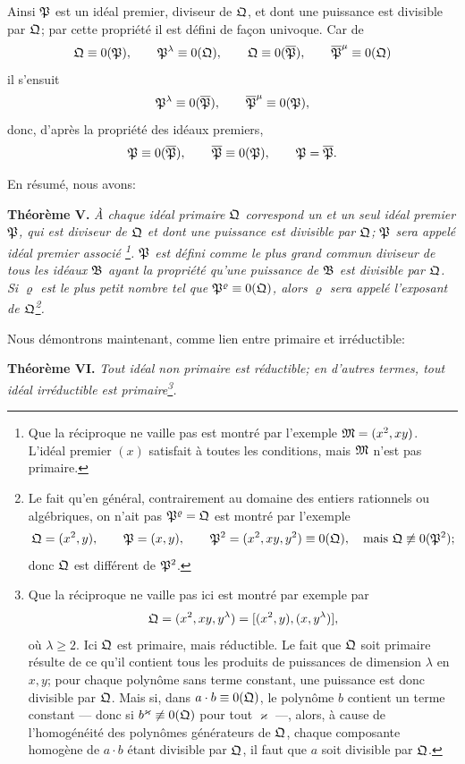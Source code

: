 Ainsi $\mathfrak{P}$ est un idéal premier, diviseur de $\mathfrak{Q}$, et dont une puissance est divisible par $\mathfrak{Q}$; par cette propriété il est défini de façon univoque. Car de
\[
 \mathfrak{Q}\equiv0(\mathfrak{P}),\qquad \mathfrak{P}^\lambda\equiv0(\mathfrak{Q}),\qquad
 \mathfrak{Q}\equiv0(\overline{\mathfrak{P}}),\qquad \overline{\mathfrak{P}}^{\mu}\equiv0(\mathfrak{Q})
\]
il s'ensuit
\[
 \mathfrak{P}^\lambda\equiv0(\overline{\mathfrak{P}}),\qquad
 \overline{\mathfrak{P}}^{\mu}\equiv0(\mathfrak{P}),
\]
donc, d'après la propriété des idéaux premiers,
\[
 \mathfrak{P}\equiv0(\overline{\mathfrak{P}}),\qquad
 \overline{\mathfrak{P}}\equiv0(\mathfrak{P}),\qquad
 \mathfrak{P}=\overline{\mathfrak{P}}.
\]

En résumé, nous avons:

\textbf{Théorème V.} \emph{À chaque idéal primaire $\mathfrak{Q}$ correspond un et un seul idéal premier $\mathfrak{P}$, qui est diviseur de $\mathfrak{Q}$ et dont une puissance est divisible par $\mathfrak{Q}$; $\mathfrak{P}$ sera appelé \og{} idéal premier associé \fg{}\footnote{Que la réciproque ne vaille pas est montré par l'exemple $\mathfrak{M}=(x^2,xy)$. L'idéal premier $(x)$ satisfait à toutes les conditions, mais $\mathfrak{M}$ n'est pas primaire.}. $\mathfrak{P}$ est défini comme le plus grand commun diviseur de tous les idéaux $\mathfrak{B}$ ayant la propriété qu'une puissance de $\mathfrak{B}$ est divisible par $\mathfrak{Q}$. Si $\varrho$ est le plus petit nombre tel que $\mathfrak{P}^\varrho\equiv0(\mathfrak{Q})$, alors $\varrho$ sera appelé l'exposant de $\mathfrak{Q}$\footnote{Le fait qu'en général, contrairement au domaine des entiers rationnels ou algébriques, on n'ait pas $\mathfrak{P}^\varrho=\mathfrak{Q}$ est montré par l'exemple
\[
 \mathfrak{Q}=(x^2,y),\qquad \mathfrak{P}=(x,y),\qquad
 \mathfrak{P}^2=(x^2,xy,y^2)\equiv0(\mathfrak{Q}),
 \quad \text{mais }\mathfrak{Q}\not\equiv0(\mathfrak{P}^2);
\]
donc $\mathfrak{Q}$ est différent de $\mathfrak{P}^2$.}.}

Nous démontrons maintenant, comme lien entre primaire et irréductible:

\textbf{Théorème VI.} \emph{Tout idéal non primaire est réductible; en d'autres termes, tout idéal irréductible est primaire\footnote{Que la réciproque ne vaille pas ici est montré par exemple par
\[
 \mathfrak{Q}=(x^2,xy,y^\lambda)=[(x^2,y),(x,y^\lambda)],
\]
où $\lambda\ge2$. Ici $\mathfrak{Q}$ est primaire, mais réductible. Le fait que $\mathfrak{Q}$ soit primaire résulte de ce qu'il contient tous les produits de puissances de dimension $\lambda$ en $x,y$; pour chaque polynôme sans terme constant, une puissance est donc divisible par $\mathfrak{Q}$. Mais si, dans $a\cdot b\equiv0(\mathfrak{Q})$, le polynôme $b$ contient un terme constant --- donc si $b^\varkappa\not\equiv0(\mathfrak{Q})$ pour tout $\varkappa$ ---, alors, à cause de l'homogénéité des polynômes générateurs de $\mathfrak{Q}$, chaque composante homogène de $a\cdot b$ étant divisible par $\mathfrak{Q}$, il faut que $a$ soit divisible par $\mathfrak{Q}$.}.}

